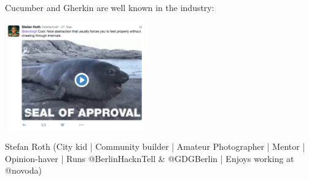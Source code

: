 \documentclass[a4paper]{report}
\begin{document}
Cucumber and Gherkin are well known in the industry:

\includegraphics[width=6cm]{./SealOfApproval.png}

Stefan Roth (City kid | Community builder | Amateur Photographer | Mentor | Opinion-haver | Runs @BerlinHacknTell & @GDGBerlin | Enjoys working at @novoda)




\end{document}
